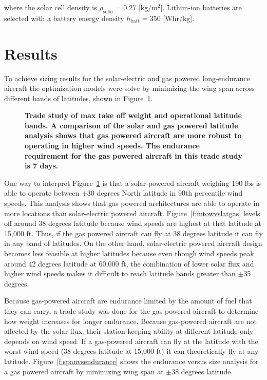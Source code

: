 \documentclass[]{aiaa-tc}%
\begin{document}
where the solar cell density is $\rho_{\text{solar}} = 0.27$ [kg/m$^2$].\cite{solartech}\cite{solarparam}
Lithim-ion batteries are selected with a battery energy density $h_{\text{batt}} = 350$ [Whr/kg].\cite{lithiumion}

\section{Results}

To achieve sizing results for the solar-electric and gas powered long-endurance aircraft the optimization models were solve by minimizing the wing span across different bands of latitudes, shown in Figure~\ref{f:latvsmtowtrade}.

\begin{figure}[H]
 \begin{subfigmatrix}{2}%
 \end{subfigmatrix}
 \caption{\textbf{Trade study of max take off weight and operational latitude bands. A comparison of the solar and gas powered latitude analysis shows that gas powered aircraft are more robust to operating in higher wind speeds. The endurance requirement for the gas powered aircraft in this trade study is 7 days.}}
 \label{f:latvsmtowtrade}
\end{figure}

One way to interpret Figure~\ref{f:latvsmtowtrade} is that a solar-powered aircraft weighing 190 lbs is able to operate between $\pm$30 degrees North latitude in 90th percentile wind speeds.  
This analysis shows that gas powered architectures are able to operate in more locations than solar-electric powered aircraft.  
Figure~\ref{f:mtowvslatgas} levels off around 38 degrees latitude because wind speeds are highest at that latitude at 15,000 ft. 
Thus, if the gas powered aircraft can fly at 38 degrees latitude it can fly in any band of latitudes.  
On the other hand, solar-electric powered aircraft design becomes less feasible at higher latitudes because even though wind speeds peak around 42 degrees latitude at 60,000 ft, the combination of lower solar flux and higher wind speeds makes it difficult to reach latitude bands greater than $\pm$35 degrees. 

Because gas-powered aircraft are endurance limited by the amount of fuel that they can carry, a trade study was done for the gas powered aircraft to determine how weight increases for longer endurance.
Because gas-powered aircraft are not affected by the solar flux, their station-keeping ability at different latitude only depends on wind speed. 
If a gas-powered aircraft can fly at the latitude with the worst wind speed (38 degrees latitude at 15,000 ft) it can theoretically fly at any latitude.  
Figure~\ref{f:spanvsendurance} shows the endurance versus size analysis for a gas powered aircraft by minimizing wing span at $\pm$38 degrees latitude.
\end{document}
